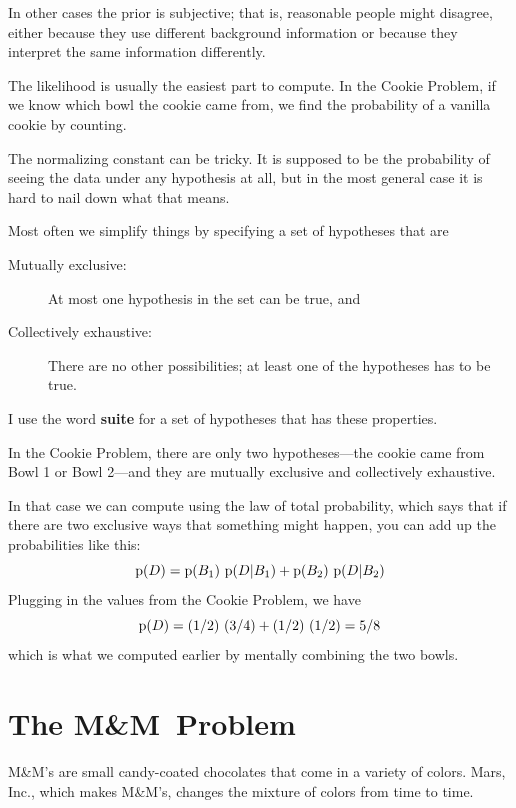 \documentclass[12pt]{book}
\begin{document}
In other cases the prior is subjective; that is, reasonable people
might disagree, either because they use different background
information or because they interpret the same information
differently.

The likelihood is usually the easiest part to compute.  In the
Cookie Problem, if we know which bowl the cookie came from,
we find the probability of a vanilla cookie by counting.

The normalizing constant can be tricky.  It is supposed to be the
probability of seeing the data under any hypothesis at all, but in the
most general case it is hard to nail down what that means.

Most often we simplify things by specifying a set of hypotheses
that are

\begin{description}

\item[Mutually exclusive:] At most one hypothesis in
the set can be true, and

\item[Collectively exhaustive:] There are no other
possibilities; at least one of the hypotheses has to be true.

\end{description}

I use the word {\bf suite} for a set of hypotheses that has these
properties.

In the Cookie Problem, there are only two hypotheses---the cookie
came from Bowl 1 or Bowl 2---and they are mutually exclusive and
collectively exhaustive.

In that case we can compute  using the law of total probability,
which says that if there are two exclusive ways that something
might happen, you can add up the probabilities like this:
%
\[ \mathrm{p}(D) = \mathrm{p}(B_1)~\mathrm{p}(D|B_1) + \mathrm{p}(B_2)~\mathrm{p}(D|B_2) \]
%
Plugging in the values from the Cookie Problem, we have
%
\[ \mathrm{p}(D) = (1/2)~(3/4) + (1/2)~(1/2) = 5/8 \]
%
which is what we computed earlier by mentally combining the two
bowls.


\newcommand{\MM}{M\&M}

\section{The \MM~Problem}

\MM's are small candy-coated chocolates that come in a variety of
colors.  Mars, Inc., which makes \MM's, changes the mixture of
colors from time to time.
\end{document}
